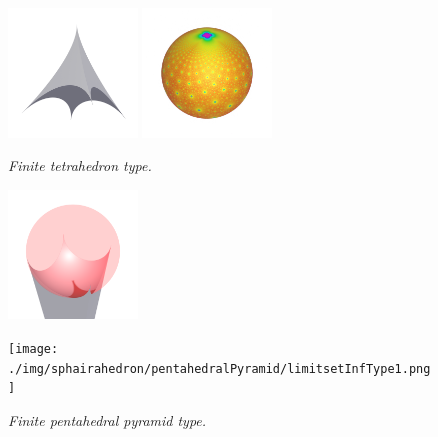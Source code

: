 \documentclass[dvipdfmx]{interact}
\theoremstyle{plain}%
\theoremstyle{definition}
\theoremstyle{remark}
\theoremstyle{problemstyle}
\begin{document}
\begin{figure}[H]
 \begin{minipage}{0.5\textwidth}
  \begin{minipage}[t]{0.24\textwidth}
   \centering
   \includegraphics[width=1.35in, height=1.35in, keepaspectratio]{./img/sphairahedron/pentahedralPyramid/sphairahedronFiniteType1.png}
  \end{minipage}
  \hspace*{\fill}
  \begin{minipage}[t]{0.24\textwidth}
   \centering
   \includegraphics[width=1.35in, height=1.35in, keepaspectratio]{./img/sphairahedron/pentahedralPyramid/limitsetFiniteType1.png}
  \end{minipage}
  \hspace*{\fill}
  \caption{\textit{Finite tetrahedron type.}}
  \label{fig:pentahedralPyramidFinite2}
 \end{minipage}
 \hspace*{\fill}
 \begin{minipage}{0.5\textwidth}
  \begin{minipage}[t]{0.24\textwidth}
   \centering
   \includegraphics[width=1.35in, height=1.35in, keepaspectratio]{./img/sphairahedron/pentahedralPyramid/sphairahedronInfType1.png}
  \end{minipage}
  \hspace*{\fill}
  \begin{minipage}[t]{0.24\textwidth}
   \centering
   \texttt{[image: ./img/sphairahedron/pentahedralPyramid/limitsetInfType1.png]}
  \end{minipage}
  \hspace*{\fill}
  \caption{\textit{Finite pentahedral pyramid type.}}
  \label{fig:pentahedralPyramidInf2}
 \end{minipage}
\end{figure}
\end{document}
